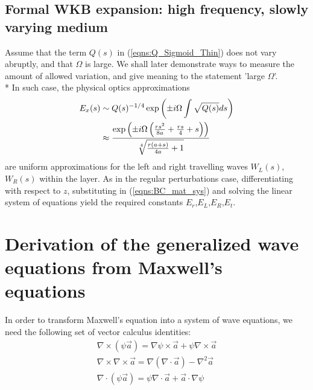 \documentclass[twocolumn,secnumarabic,amssymb, nobibnotes, aps, prd]{revtex4-1}
\begin{document}
\subsection{Formal WKB expansion: high frequency, slowly varying medium}
Assume that the term $Q(s)$ in (\ref{eqns:Q_Sigmoid_Thin}) does not vary abruptly, and that $\Omega$ is large. We shall later demonstrate ways to measure the amount of allowed variation, and give meaning to the statement 'large $\Omega$'. \\*
In such case, the physical optics approximations 
\begin{align}
E_x(s) &\sim Q(s)^{-1/4}\exp \left( \pm i \Omega \int \sqrt{Q(s)}ds\right) \notag \\
& \approx \dfrac{\exp \left(\pm i \Omega  \left(\frac{r s^2}{8 a}+\frac{r s}{4}+s\right) \right)}{\sqrt[4]{\frac{r (a+s)}{4 a}+1}}
\end{align}
are uniform approximations for the left and right travelling waves $W_L(s)$, $W_R(s)$ within the layer. As in the regular perturbations case, differentiating with respect to $z$, substituting in (\ref{eqns:BC_mat_sys}) and solving the linear system of equations yield the required constants $E_r$,$E_L$,$E_R$,$E_t$. 

\newpage

  

\appendix
\section{Derivation of the generalized wave equations from Maxwell's equations}

\label{append:GeneralizedWaveDeriv}
In order to transform Maxwell's equation into a system of wave equations, we need the following set of vector calculus identities:
\begin{subequations}
\label{eqns:vectorCalcIDs}
	\begin{align}
			\nabla \times (\psi \overrightarrow{a}) = \nabla \psi \times 	
			\overrightarrow{a} + \psi \nabla \times \overrightarrow{a}  \label{eqns:ProdCurlID}\\
		\nabla \times \nabla \times \overrightarrow{a} = \nabla ( \nabla
			 \cdot \overrightarrow{a} ) - \nabla^2\overrightarrow{a} \label{eqns:CurlCurlID}\\
		\nabla \cdot (\psi \overrightarrow{a}) = \psi \nabla \cdot \overrightarrow{a}
			 + \overrightarrow{a} \cdot \nabla \psi \label{eqns:DivProdID}
			\end{align}
\end{subequations}
\end{document}
